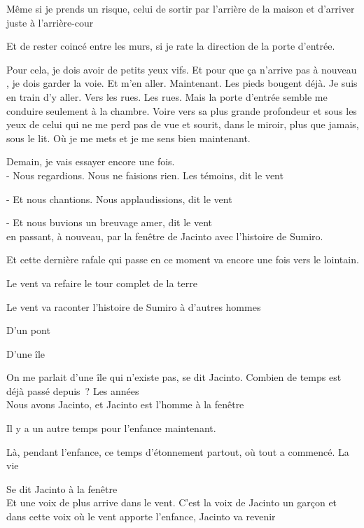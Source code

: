 Même si je prends un risque, celui de sortir par l'arrière de la maison
et d'arriver juste à l'arrière-cour

Et de rester coincé entre les murs, si je rate la direction de la porte
d'entrée.

Pour cela, je dois avoir de petits yeux vifs. Et pour que ça n'arrive
pas à nouveau , je dois garder la voie. Et m'en aller. Maintenant. Les
pieds bougent déjà. Je suis en train d'y aller. Vers les rues. Les rues.
Mais la porte d'entrée semble me conduire seulement à la chambre. Voire
vers sa plus grande profondeur et sous les yeux de celui qui ne me perd
pas de vue et sourit, dans le miroir, plus que jamais, sous le lit. Où
je me mets et je me sens bien maintenant.

Demain, je vais essayer encore une fois.\\

- Nous regardions. Nous ne faisions rien. Les témoins, dit le vent

- Et nous chantions. Nous applaudissions, dit le vent

- Et nous buvions un breuvage amer, dit le vent\\

en passant, à nouveau, par la fenêtre de Jacinto avec l'histoire de
Sumiro.

Et cette dernière rafale qui passe en ce moment va encore une fois vers
le lointain.

Le vent va refaire le tour complet de la terre

Le vent va raconter l'histoire de Sumiro à d'autres hommes

\clearpage
\thispagestyle{empty}
\movetoevenpage

D'un pont

D'une île

On me parlait d'une île qui n'existe pas, se dit Jacinto. Combien de
temps est déjà passé depuis~? Les années\\

Nous avons Jacinto, et Jacinto est l'homme à la fenêtre

\pagebreak

Il y a un autre temps pour l'enfance maintenant.

Là, pendant l'enfance, ce temps d'étonnement partout, où tout a
commencé. La vie

Se dit Jacinto à la fenêtre\\

Et une voix de plus arrive dans le vent. C'est la voix de Jacinto un
garçon et dans cette voix où le vent apporte l'enfance, Jacinto va
revenir\\

